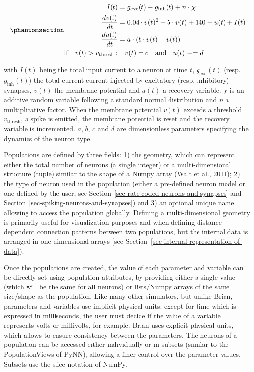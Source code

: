 \documentclass[
  11pt,
  a4paper,
]{scrbook}
\begin{document}
\begin{equation}\phantomsection\label{eq-fini:izhikevich}{
\begin{aligned}
I(t)               & =  g_\text{exc}(t) - g_\text{inh}(t) + n \cdot \chi\\
\frac{dv(t)}{dt}   & =  0.04 \cdot v(t)^2 + 5 \cdot v(t) + 140 - u(t) + I(t) \\
\frac{du(t)}{dt}   & =  a \cdot (b \cdot v(t) - u(t)) \\
\text{if} \quad v(t) > v_\text{thresh} :  & \quad v(t) = c \quad \text{and} \quad u(t) \text{ += } d
\end{aligned}
}\end{equation}

with \(I(t)\) being the total input current to a neuron at time \(t\),
\(g_\text{exc}(t)\) (resp. \(g_\text{inh}(t)\)) the total current
current injected by excitatory (resp. inhibitory) synapses, \(v(t)\) the
membrane potential and \(u(t)\) a recovery variable. \(\chi\) is an
additive random variable following a standard normal distribution and
\(n\) a multiplicative factor. When the membrane potential \(v(t)\)
exceeds a threshold \(v_\text{thresh}\), a spike is emitted, the
membrane potential is reset and the recovery variable is incremented.
\(a\), \(b\), \(c\) and \(d\) are dimensionless parameters specifying
the dynamics of the neuron type.

Populations are defined by three fields: 1) the geometry, which can
represent either the total number of neurons (a single integer) or a
multi-dimensional structure (tuple) similar to the shape of a Numpy
array (Walt et al., 2011); 2) the type of neuron used in the population
(either a pre-defined neuron model or one defined by the user, see
Section~\ref{sec-rate-coded-neurons-and-synapses} and
Section~\ref{sec-spiking-neurons-and-synapses}) and 3) an optional
unique name allowing to access the population globally. Defining a
multi-dimensional geometry is primarily useful for visualization
purposes and when defining distance-dependent connection patterns
between two populations, but the internal data is arranged in
one-dimensional arrays (see
Section~\ref{sec-internal-representation-of-data}).

Once the populations are created, the value of each parameter and
variable can be directly set using population attributes, by providing
either a single value (which will be the same for all neurons) or
lists/Numpy arrays of the same size/shape as the population. Like many
other simulators, but unlike Brian, parameters and variables use
implicit physical units: except for time which is expressed in
milliseconds, the user must decide if the value of a variable represents
volts or millivolts, for example. Brian uses explicit physical units,
which allows to ensure consistency between the parameters. The neurons
of a population can be accessed either individually or in subsets
(similar to the PopulationViews of PyNN), allowing a finer control over
the parameter values. Subsets use the slice notation of NumPy.
\end{document}

